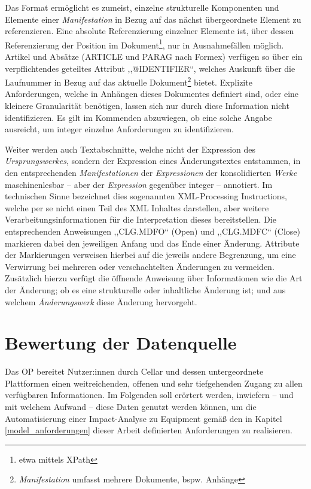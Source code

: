     \medskip
    Das Format ermöglicht es zumeist, einzelne strukturelle Komponenten und Elemente einer \textit{Manifestation} in Bezug auf das nächst übergeordnete Element zu referenzieren.
    Eine absolute Referenzierung einzelner Elemente ist, über dessen Referenzierung der Position im Dokument\footnote{etwa mittels XPath}, nur in Ausnahmefällen möglich.
    Artikel und Absätze (\textsf{ARTICLE} und \textsf{PARAG} nach Formex) verfügen so über ein verpflichtendes geteiltes Attribut ,,\textsf{@IDENTIFIER}``, welches Auskunft über die Laufnummer in Bezug auf das aktuelle Dokument\footnote{\textit{Manifestation} umfasst mehrere Dokumente, bspw. Anhänge} bietet. 
    Explizite Anforderungen, welche in Anhängen dieses Dokumentes definiert sind, oder eine kleinere Granularität benötigen, lassen sich nur durch diese Information nicht identifizieren.
    Es gilt im Kommenden abzuwiegen, ob eine solche Angabe ausreicht, um integer einzelne Anforderungen zu identifizieren. 

    \medskip
    Weiter werden auch Textabschnitte, welche nicht der Expression des \textit{Ursprungswerkes}, sondern der Expression eines Änderungstextes entstammen, in den entsprechenden \textit{Manifestationen} der \textit{Expressionen} der konsolidierten \textit{Werke} maschinenlesbar -- aber der \textit{Expression} gegenüber integer -- annotiert. 
    Im technischen Sinne bezeichnet dies sogenannten \ac{XML}-Processing Instructions, welche per se nicht einen Teil des \ac{XML} Inhaltes darstellen, aber weitere Verarbeitungsinformationen für die Interpretation dieses bereitstellen. 
    Die entsprechenden Anweisungen ,,\textsf{CLG.MDFO}`` (Open) und ,,\textsf{CLG.MDFC}`` (Close) markieren dabei den jeweiligen Anfang und das Ende einer Änderung. 
    Attribute der Markierungen verweisen hierbei auf die jeweils andere Begrenzung, um eine Verwirrung bei mehreren oder verschachtelten Änderungen zu vermeiden.
    Zusätzlich hierzu verfügt die öffnende Anweisung über Informationen wie die Art der Änderung; ob es eine strukturelle oder inhaltliche Änderung ist; und aus welchem \textit{Änderungswerk} diese Änderung hervorgeht. 
    \cite[vgl. S. 76 -- 79]{eu_fmx4_proc}
    
\section{Bewertung der Datenquelle}

    Das \acf{OP} bereitet Nutzer:innen durch Cellar und dessen untergeordnete Plattformen einen weitreichenden, offenen und sehr tiefgehenden Zugang zu allen verfügbaren Informationen.
    Im Folgenden soll erörtert werden, inwiefern -- und mit welchem Aufwand -- diese Daten genutzt werden können, um die Automatisierung einer Impact-Analyse zu \atmans{} Equipment gemäß den in Kapitel \ref{model_anforderungen} dieser Arbeit definierten Anforderungen zu realisieren.

